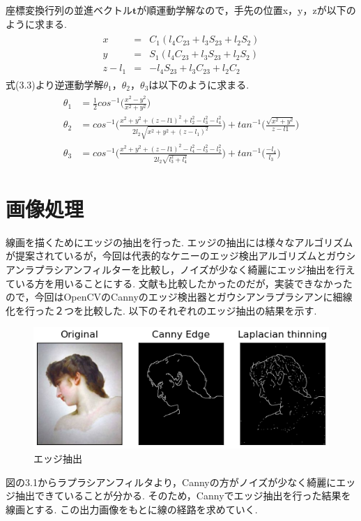 	座標変換行列の並進ベクトル$\boldsymbol{t}$が順運動学解なので，手先の位置x，y，zが以下のように求まる.
	\begin{equation}
			\begin{array}{c}
			\begin{split}
				x &=& C_1(l_4C_{23} + l_3S_{23} + l_2S_2) \\
				y &=& S_1(l_4C_{23} + l_3S_{23} + l_2S_2) \\
				z - l_1 &=& -l_4S_{23} + l_3C_{23} + l_2C_2
			\end{split}
		\end{array}
	\end{equation}
	式(3.3)より逆運動学解$\theta_1，\theta_2，\theta_3$は以下のように求まる.
	\begin{equation}
			\begin{array}{c}
			\begin{split}
				\theta_1  &  =\frac{1}{2}  cos^{-1}\biggl( \frac{x^2-y^2}{x^2+y^2} \biggr) \\
				\theta_2 & = cos^{-1}\biggl( \frac{x^2+y^2+(z-l1)^2 + l_2^2-l_3^2-l_4^2}{2l_2\sqrt{x^2+y^2+(z-l_1)^2}} \biggr) + tan^{-1}\biggl( \frac{\sqrt{x^2+y^2}}{z-l1}\biggr) \\
				\theta_3 & =cos^{-1}\biggl( \frac{x^2+y^2+(z-l1)^2 - l_4^2-l_3^2-l_2^2}{2l_2\sqrt{l_3^2+l_4^2}}\biggr) + tan^{-1}\biggl( \frac{-l_4}{l_3}\biggr)
			\end{split}
			\end{array}
	\end{equation}
	\section{画像処理}
	線画を描くためにエッジの抽出を行った. エッジの抽出には様々なアルゴリズムが提案されているが，今回は代表的なケニーのエッジ検出アルゴリズムとガウシアンラプラシアンフィルターを比較し，ノイズが少なく綺麗にエッジ抽出を行えている方を用いることにする. 
	文献\cite{4}も比較したかったのだが，実装できなかったので，今回はOpenCVのCannyのエッジ検出器とガウシアンラプラシアンに細線化を行った２つを比較した. 以下のそれぞれのエッジ抽出の結果を示す. 
	 \begin{center}
        \begin{figure}[h]
            \includegraphics[width=1.0\textwidth]{./img/001.png}
            \caption{エッジ抽出}
            \label{manipulator}
        \end{figure}
    \end{center}
	図の3.1からラプラシアンフィルタより，Cannyの方がノイズが少なく綺麗にエッジ抽出できていることが分かる. そのため，Cannyでエッジ抽出を行った結果を線画とする. この出力画像をもとに線の経路を求めていく.
